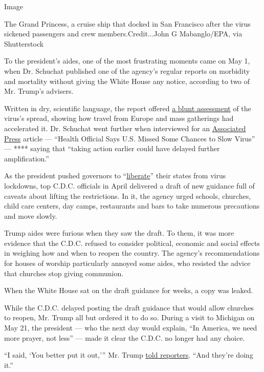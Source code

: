 Image

The Grand Princess, a cruise ship that docked in San Francisco after the
virus sickened passengers and crew members.Credit...John G Mabanglo/EPA,
via Shutterstock

To the president's aides, one of the most frustrating moments came on
May 1, when Dr. Schuchat published one of the agency's regular reports
on morbidity and mortality without giving the White House any notice,
according to two of Mr. Trump's advisers.

Written in dry, scientific language, the report offered
\href{https://www.cdc.gov/mmwr/volumes/69/wr/mm6918e2.htm?s_cid=mm6918e2_w}{a
blunt assessment} of the virus's spread, showing how travel from Europe
and mass gatherings had accelerated it. Dr. Schuchat went further when
interviewed for an
\href{https://apnews.com/a758f05f337736e93dd0c280deff9b10}{Associated
Press} article --- ``Health Official Says U.S. Missed Some Chances to
Slow Virus'' --- **** saying that ``taking action earlier could have
delayed further amplification.''

As the president pushed governors to
``\href{https://twitter.com/realDonaldTrump/status/1251169217531056130}{liberate}''
their states from virus lockdowns, top C.D.C. officials in April
delivered a draft of new guidance full of caveats about lifting the
restrictions. In it, the agency urged schools, churches, child care
centers, day camps, restaurants and bars to take numerous precautions
and move slowly.

Trump aides were furious when they saw the draft. To them, it was more
evidence that the C.D.C. refused to consider political, economic and
social effects in weighing how and when to reopen the country. The
agency's recommendations for houses of worship particularly annoyed some
aides, who resisted the advice that churches stop giving communion.

When the White House sat on the draft guidance for weeks, a copy was
leaked.

While the C.D.C. delayed posting the draft guidance that would allow
churches to reopen, Mr. Trump all but ordered it to do so. During a
visit to Michigan on May 21, the president --- who the next day would
explain, ``In America, we need more prayer, not less'' --- made it clear
the C.D.C. no longer had any choice.

``I said, `You better put it out,''' Mr. Trump
\href{https://www.nytimes3xbfgragh.onion/aponline/2020/05/21/health/ap-us-med-virus-outbreak-churches-reopening.html}{told
reporters}. ``And they're doing it.''

